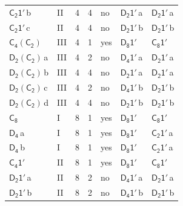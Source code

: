 \documentclass[10pt,a4paper]{article}
\numberwithin{equation}{section}
\newcommand{\grp}[1]{\mathsf{#1}}
\newcommand{\clsletter}[1]{\,{\scriptsize\color{black!55}#1}}
\begin{document}
{\begin{longtable}{@{}llrrlll@{}}
\href{C2-1p.pdf}{$\grp{C_{2}1'}$}\clsletter{b} & II & 4 & 4 & no & \href{D2-1p.pdf}{$\grp{D_{2}1'}$}\clsletter{a} & \href{D2-1p.pdf}{$\grp{D_{2}1'}$}\clsletter{a}\\
\href{C2-1p.pdf}{$\grp{C_{2}1'}$}\clsletter{c} & II & 4 & 4 & no & \href{D2-1p.pdf}{$\grp{D_{2}1'}$}\clsletter{b} & \href{D2-1p.pdf}{$\grp{D_{2}1'}$}\clsletter{b}\\
\href{C4-C2.pdf}{$\grp{C_{4}}(\grp{C_{2}})$} & III & 4 & 1 & yes & \href{D8-1p.pdf}{$\grp{D_{8}1'}$} & \href{C8-1p.pdf}{$\grp{C_{8}1'}$}\\
\href{D2-C2.pdf}{$\grp{D_{2}}(\grp{C_{2}})$}\clsletter{a} & III & 4 & 2 & no & \href{D4-1p.pdf}{$\grp{D_{4}1'}$}\clsletter{a} & \href{D2-1p.pdf}{$\grp{D_{2}1'}$}\clsletter{a}\\
\href{D2-C2.pdf}{$\grp{D_{2}}(\grp{C_{2}})$}\clsletter{b} & III & 4 & 4 & no & \href{D2-1p.pdf}{$\grp{D_{2}1'}$}\clsletter{a} & \href{D2-1p.pdf}{$\grp{D_{2}1'}$}\clsletter{a}\\
\href{D2-C2.pdf}{$\grp{D_{2}}(\grp{C_{2}})$}\clsletter{c} & III & 4 & 2 & no & \href{D4-1p.pdf}{$\grp{D_{4}1'}$}\clsletter{b} & \href{D2-1p.pdf}{$\grp{D_{2}1'}$}\clsletter{b}\\
\href{D2-C2.pdf}{$\grp{D_{2}}(\grp{C_{2}})$}\clsletter{d} & III & 4 & 4 & no & \href{D2-1p.pdf}{$\grp{D_{2}1'}$}\clsletter{b} & \href{D2-1p.pdf}{$\grp{D_{2}1'}$}\clsletter{b}\\
\href{../../../rotation/data/pdf/C8.pdf}{$\grp{C_{8}}$} & I & 8 & 1 & yes & \href{D8-1p.pdf}{$\grp{D_{8}1'}$} & \href{C8-1p.pdf}{$\grp{C_{8}1'}$}\\
\href{../../../rotation/data/pdf/D4.pdf}{$\grp{D_{4}}$}\clsletter{a} & I & 8 & 1 & yes & \href{D8-1p.pdf}{$\grp{D_{8}1'}$} & \href{C2-1p.pdf}{$\grp{C_{2}1'}$}\clsletter{a}\\
\href{../../../rotation/data/pdf/D4.pdf}{$\grp{D_{4}}$}\clsletter{b} & I & 8 & 1 & yes & \href{D8-1p.pdf}{$\grp{D_{8}1'}$} & \href{C2-1p.pdf}{$\grp{C_{2}1'}$}\clsletter{a}\\
\href{C4-1p.pdf}{$\grp{C_{4}1'}$} & II & 8 & 1 & yes & \href{D8-1p.pdf}{$\grp{D_{8}1'}$} & \href{C8-1p.pdf}{$\grp{C_{8}1'}$}\\
\href{D2-1p.pdf}{$\grp{D_{2}1'}$}\clsletter{a} & II & 8 & 2 & no & \href{D4-1p.pdf}{$\grp{D_{4}1'}$}\clsletter{a} & \href{D2-1p.pdf}{$\grp{D_{2}1'}$}\clsletter{a}\\
\href{D2-1p.pdf}{$\grp{D_{2}1'}$}\clsletter{b} & II & 8 & 2 & no & \href{D4-1p.pdf}{$\grp{D_{4}1'}$}\clsletter{b} & \href{D2-1p.pdf}{$\grp{D_{2}1'}$}\clsletter{b}\\

\end{longtable}}
\end{document}
